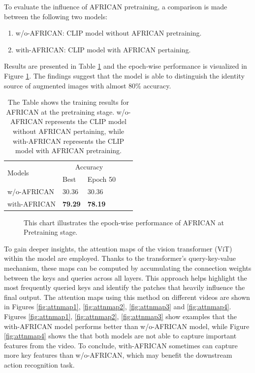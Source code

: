 To evaluate the influence of AFRICAN pretraining, a comparison is made between the following two models: 

\begin{enumerate}
    \item w/o-AFRICAN: CLIP model without AFRICAN pretraining.
    \item with-AFRICAN: CLIP model with AFRICAN pertaining.
\end{enumerate}

Results are presented in Table \ref{tab:africanpretrainingresults} and the epoch-wise performance is visualized in Figure \ref{fig:tp_africanpretraining}. The findings suggest that the model is able to distinguish the identity source of augmented images with almost 80\% accuracy. 

\begin{table}[ht]
    \centering
    \caption[Training Results for AFRICAN at Pretraining stage]{The Table shows the training results for AFRICAN at the pretraining stage. w/o-AFRICAN represents the CLIP model without AFRICAN pertaining, while with-AFRICAN represents the CLIP model with AFRICAN pretraining.
}
    \label{tab:africanpretrainingresults}
    \begin{tabular}{lllll}
        \toprule
        \multirow{2}{*}{Models} & \multicolumn{2}{c}{Accuracy} \\
        \cmidrule{2-3} 
        {} &  Best & Epoch 50\\
        \midrule
        w/o-AFRICAN   & 30.36 & 30.36 \\
        with-AFRICAN  & \textbf{79.29} & \textbf{78.19} \\
        \bottomrule
    \end{tabular}
\end{table}

\begin{figure}[ht]
    \centering
    \resizebox{1.0\textwidth}{!}{}
    \caption[Accuracy of AFRICAN on each Epoch at Pretraining stage]{This chart illustrates the epoch-wise performance of AFRICAN at Pretraining stage.}
    \label{fig:tp_africanpretraining}
\end{figure}

To gain deeper insights, the attention maps of the vision transformer (ViT) within the model are employed. Thanks to the transformer's query-key-value mechanism, these maps can be computed by accumulating the connection weights between the keys and queries across all layers. This approach helps highlight the most frequently queried keys and identify the patches that heavily influence the final output. The attention maps using this method on different videos are shown in Figures \ref{fig:attnmap1}, \ref{fig:attnmap2}, \ref{fig:attnmap3} and \ref{fig:attnmap4}. Figures \ref{fig:attnmap1}, \ref{fig:attnmap2}, \ref{fig:attnmap3} show examples that the with-AFRICAN model performs better than w/o-AFRICAN model, while Figure \ref{fig:attnmap4} shows the that both models are not able to capture important features from the video. To conclude,  with-AFRICAN sometimes can capture more key features than w/o-AFRICAN, which may benefit the downstream action recognition task.

